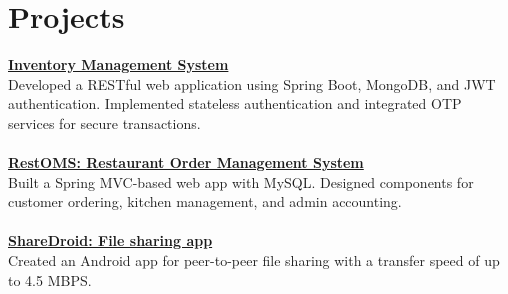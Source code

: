\documentclass[a4paper,10.5pt]{article}
\begin{document}

\section{Projects}
\href{https://github.com/yashnmodi/Inventory_Management}{\textbf{Inventory Management System}} \\
Developed a RESTful web application using Spring Boot, MongoDB, and JWT authentication. Implemented stateless authentication and integrated OTP services for secure transactions. \\ \\
\href{https://github.com/yashnmodi/RestOMS}{\textbf{RestOMS: Restaurant Order Management System}} \\
Built a Spring MVC-based web app with MySQL. Designed components for customer ordering, kitchen management, and admin accounting. \\ \\
\href{https://github.com/yashnmodi/ShareDroid}{\textbf{ShareDroid: File sharing app}} \\
Created an Android app for peer-to-peer file sharing with a transfer speed of up to 4.5 MBPS.
\end{document}
